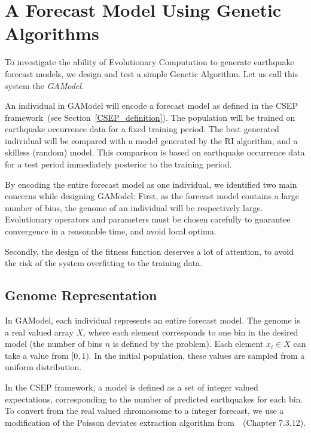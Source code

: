 \documentclass{sig-alternate}
\begin{document}
\section{A Forecast Model Using Genetic Algorithms} 

To investigate the ability of Evolutionary Computation to generate
earthquake forecast models, we design and test a simple Genetic
Algorithm. Let us call this system the \emph{GAModel}.

An individual in GAModel will encode a forecast model as defined in
the CSEP framework~(see Section~\ref{CSEP_definition}). The population
will be trained on earthquake occurrence data for a fixed training
period. The best generated individual will be compared with a model
generated by the RI algorithm, and a skilless (random) model. This
comparison is based on earthquake occurrence data for a test period
immediately posterior to the training period.

By encoding the entire forecast model as one individual, we identified
two main concerns while designing GAModel: First, as the forecast
model contains a large number of bins, the genome of an individual
will be respectively large. Evolutionary operators and parameters must
be chosen carefully to guarantee convergence in a reasonable time, and
avoid local optima.

Secondly, the design of the fitness function deserves a lot of
attention, to avoid the risk of the system overfitting to the training
data.

\subsection{Genome Representation}

In GAModel, each individual represents an entire forecast model. The
genome is a real valued array $X$, where each element corresponds to
one bin in the desired model (the number of bins $n$ is defined by the
problem). Each element $x_i \in X$ can take a value from $[0,1)$. In
  the initial population, these values are sampled from a uniform
  distribution.

In the CSEP framework, a model is defined as a set of integer valued
expectations, corresponding to the number of predicted earthquakes for
each bin. To convert from the real valued chromossome to a integer
forecast, we use a modification of the Poisson deviates extraction
algorithm from~\cite{NumericalRecipes}~(Chapter 7.3.12).
\end{document}
